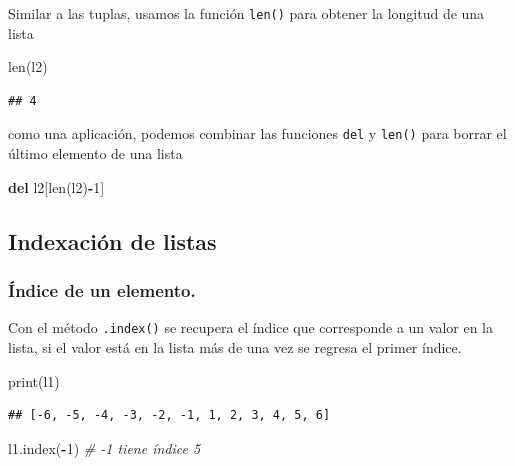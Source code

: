 \documentclass[
]{book}
\newenvironment{Shaded}{\begin{snugshade}}{\end{snugshade}}
\newcommand{\BuiltInTok}[1]{#1}
\newcommand{\CommentTok}[1]{\textcolor[rgb]{0.56,0.35,0.01}{\textit{#1}}}
\newcommand{\DecValTok}[1]{\textcolor[rgb]{0.00,0.00,0.81}{#1}}
\newcommand{\KeywordTok}[1]{\textcolor[rgb]{0.13,0.29,0.53}{\textbf{#1}}}
\newcommand{\NormalTok}[1]{#1}
\newcommand{\OperatorTok}[1]{\textcolor[rgb]{0.81,0.36,0.00}{\textbf{#1}}}
\theoremstyle{definition}
\theoremstyle{definition}
\theoremstyle{definition}
\theoremstyle{definition}
\theoremstyle{remark}
\begin{document}
Similar a las tuplas, usamos la función \texttt{len()} para obtener la longitud de una lista

\begin{Shaded}
\begin{Highlighting}[]
\BuiltInTok{len}\NormalTok{(l2)}
\end{Highlighting}
\end{Shaded}

\begin{verbatim}
## 4
\end{verbatim}

como una aplicación, podemos combinar las funciones \texttt{del} y \texttt{len()} para borrar el último elemento de una lista

\begin{Shaded}
\begin{Highlighting}[]
\KeywordTok{del}\NormalTok{ l2[}\BuiltInTok{len}\NormalTok{(l2)}\OperatorTok{{-}}\DecValTok{1}\NormalTok{] }
\end{Highlighting}
\end{Shaded}

\hypertarget{indexaciuxf3n-de-listas}{%
\subsection{Indexación de listas}\label{indexaciuxf3n-de-listas}}

\hypertarget{uxedndice-de-un-elemento.}{%
\subsubsection{Índice de un elemento.}\label{uxedndice-de-un-elemento.}}

Con el método \texttt{.index()} se recupera el índice que corresponde a un valor en la lista, si el valor está en la lista más de una vez se regresa el primer índice.

\begin{Shaded}
\begin{Highlighting}[]
\BuiltInTok{print}\NormalTok{(l1)}
\end{Highlighting}
\end{Shaded}

\begin{verbatim}
## [-6, -5, -4, -3, -2, -1, 1, 2, 3, 4, 5, 6]
\end{verbatim}

\begin{Shaded}
\begin{Highlighting}[]
\NormalTok{l1.index(}\OperatorTok{{-}}\DecValTok{1}\NormalTok{) }\CommentTok{\# {-}1 tiene índice 5 }
\end{Highlighting}
\end{Shaded}
\end{document}

